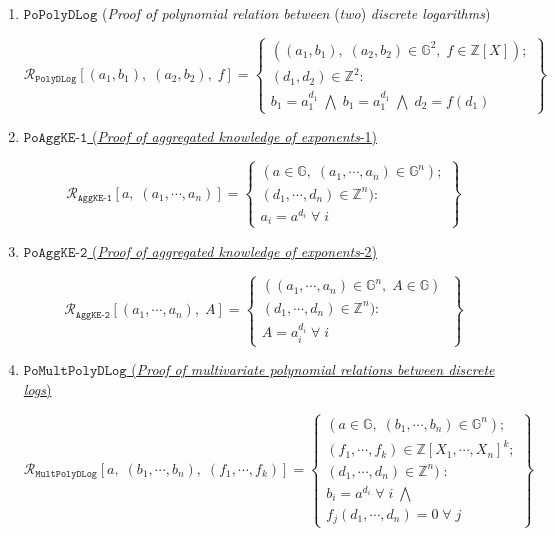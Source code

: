 \documentclass[11pt, lettersize, notitlepage, leqno, footskip=0.6cm]{article}
\newcommand{\bz}{\mathbb Z}
\newcommand{\ttt}{\texttt}
\newcommand{\mc}{\mathcal}
\newcommand{\mb}{\mathbb}
\numberwithin{equation}{section}
\begin{document}
{{\begin{enumerate}[wide, labelwidth=!, labelindent=0pt]
 

\item $\ttt{PoPolyDLog}$ (\textit{Proof of polynomial relation between} (\textit{two}) \textit{discrete logarithms})\vspace{-0.3cm}

\[
  \mc{R}_{{\ttt{PolyDLog}}}[(a_1, b_1),\;(a_2,b_2),\;f] = \left\{\begin{array}{l}
    ((a_1, b_1), \; (a_2,b_2)\in\mb{G}^2,\;f\in\bz[X]);\\
    (d_1, d_2)\in\mb{Z}^2: \\
    b_1 = a_1^{d_1}\; \bigwedge\; b_1 = a_1^{d_1}\; \bigwedge \;d_2 = f(d_1)
  \end{array}\right\}
\]

\item \hyperlink{AggKE-1}{$\ttt{PoAggKE-1}$ (\textit{Proof of aggregated knowledge of exponents}-1)} \vspace{-0.3cm}

\[
  \mc{R}_{{\ttt{AggKE-1}}}[a,\; (a_1,\cdots, a_n)] = \left\{\begin{array}{l}
    (a\in\mb{G},\; (a_1,\cdots, a_n)\in\mb{G}^n);\\ 
    (d_1,\cdots,d_n)\in\bz^n):  \\
    a_i = a^{d_i}\;\forall\; i
  \end{array}\right\}
\]


\item \hyperlink{AggKE-2}{$\ttt{PoAggKE-2}$ (\textit{Proof of aggregated knowledge of exponents}-2)} \vspace{-0.3cm}

\[
  \mc{R}_{{\ttt{AggKE-2}}}[(a_1,\cdots, a_n),\;A] = \left\{\begin{array}{l}
    ((a_1,\cdots, a_n)\in \mb{G}^n,\; A\in\mb{G})\;\\ 
    (d_1,\cdots,d_n)\in\bz^n) :  \\
     A = a_i^{d_i}\;\forall\;  i
  \end{array}\right\}
\]

\item \hyperlink{Mult}{$\ttt{PoMultPolyDLog}$ (\textit{Proof of multivariate polynomial relations between discrete logs})}\vspace{-0.6cm}

\[
  \mc{R}_{\ttt{MultPolyDLog}}[a,\; (b_1,\cdots, b_n),\; (f_1,\cdots,f_k)] = \left\{\begin{array}{l}
    (a\in\mb{G},\; (b_1,\cdots, b_n)\in\mb{G}^n);\\
    (f_1,\cdots,f_k)\in\bz[X_1,\cdots,X_n]^k;\\ 
    (d_1,\cdots,d_n)\in\bz^n)\;: \\
    b_i = a^{d_i}\;\forall\; i\;\bigwedge \;\\   f_j(d_1,\cdots,d_n) = 0\;\forall\; j 
  \end{array}\right\}
\]



\end{enumerate}}}
\end{document}
